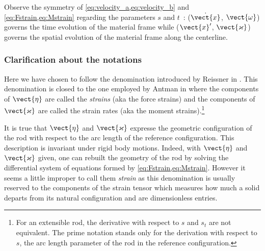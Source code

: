 Observe the symmetry of \cref{eq:velocity_a,eq:velocity_b} and \cref{eq:Fstrain,eq:Mstrain} regarding the parameters $s$ and $t$~: ($\dot{\vect{x}}$, $\vect{\omega}$) governs the time evolution of the material frame while ($\vect{x}'$, $\vect{\varkappa}$) governs the spatial evolution of the material frame along the centerline.

\subsubsection{Clarification about the notations}
Here we have chosen to follow the denomination introduced by Reissner in \cite{Reissner1973}. This denomination is closed to the one employed by Antman in \cite[p.~284]{Antman2005} where the components of $\vect{\eta}$ are called the \emph{strains} (aka the force strains) and the components of $\vect{\varkappa}$ are called the strain rates (aka the moment strains).\footnote{For an extensible rod, the derivative with respect to $s$ and $s_t$ are not equivalent. The prime notation stands only for the derivation with respect to $s$, the arc length parameter of the rod in the reference configuration.}

It is true that $\vect{\eta}$ and $\vect{\varkappa}$ expresse the geometric configuration of the rod with respect to the arc length of the reference configuration. This description is invariant under rigid body motions. Indeed, with $\vect{\eta}$ and $\vect{\varkappa}$ given, one can rebuilt the geometry of the rod by solving the differential system of equations formed by \cref{eq:Fstrain,eq:Mstrain}. However it seems a little improper to call them \emph{strain} as this denomination is usually reserved to the components of the strain tensor which measures how much a solid departs from its natural configuration and are dimensionless entries.

